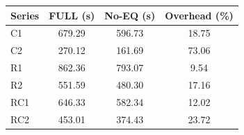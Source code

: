 \begin{tabular}{lccc}
\toprule
\textbf{Series} & \textbf{FULL (s)} & \textbf{No-EQ (s)} & \textbf{Overhead (\%)} \\
\midrule
C1 & 679.29 & 596.73 & 18.75 \\
C2 & 270.12 & 161.69 & 73.06 \\
R1 & 862.36 & 793.07 & 9.54 \\
R2 & 551.59 & 480.30 & 17.16 \\
RC1 & 646.33 & 582.34 & 12.02 \\
RC2 & 453.01 & 374.43 & 23.72 \\
\bottomrule
\end{tabular}
